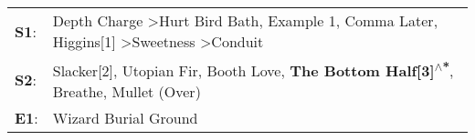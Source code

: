 \begin{supertabular}{p{0.03\textwidth}p{0.92\textwidth}}
 \textbf{S1}:  &  Depth Charge\textsuperscript{} \textgreater \enspace Hurt Bird Bath\textsuperscript{}, \enspace Example 1\textsuperscript{}, \enspace Comma Later\textsuperscript{}, \enspace Higgins[1]\textsuperscript{} \textgreater \enspace Sweetness\textsuperscript{} \textgreater \enspace Conduit\textsuperscript{}  \enspace  \\
 \textbf{S2}:  &                                                    Slacker[2]\textsuperscript{}, \enspace Utopian Fir\textsuperscript{}, \enspace Booth Love\textsuperscript{}, \enspace \textbf{The Bottom Half[3]\textsuperscript{$\wedge$*}}, \enspace Breathe\textsuperscript{}, \enspace Mullet (Over)\textsuperscript{}  \enspace  \\
 \textbf{E1}:  &                                                                                                                                                                                                                                                                        Wizard Burial Ground\textsuperscript{}  \enspace  \\
\end{supertabular}
